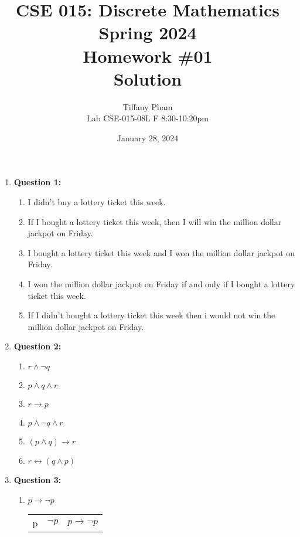 \documentclass[11pt]{article}
\begin{document}
\author{Tiffany Pham\\
Lab CSE-015-08L F 8:30-10:20pm}
\title{CSE 015: Discrete Mathematics\\
Spring 2024\\
Homework \#01\\
Solution}
\date{January 28, 2024}
\maketitle
\begin{enumerate}
\item
\textbf{Question 1:}
\begin{enumerate}[label=(\alph*)]
\item I didn't buy a lottery ticket this week.
\item If I bought a lottery ticket this week, then I will win the million dollar jackpot on Friday.
\item I bought a lottery ticket this week and I won the million dollar jackpot on Friday.
\item I won the million dollar jackpot on Friday if and only if I bought a lottery ticket this week.
\item If I didn't bought a lottery ticket this week then i would not win the million dollar jackpot on Friday.
\end{enumerate}
\item
\textbf{Question 2:}
\begin{enumerate}[label=(\alph*)]
\item $r\land\lnot q$
\item $p\land q\land r$
\item $r\rightarrow p$
\item $p\land\lnot q\land r$
\item $(p\land q)\rightarrow r$
\item $r\leftrightarrow(q\land p)$
\end{enumerate}
\item \textbf{Question 3:}
\begin{enumerate}[label=(\alph*)]
    \item $p\rightarrow\lnot p$
    \begin{center}
        \begin{tabular}{|c|c|c|}
        \hline
        p & $\lnot p$ & $p\rightarrow\lnot p$ \\

\end{tabular}
\end{center}
\end{enumerate}
\end{enumerate}
\end{document}
